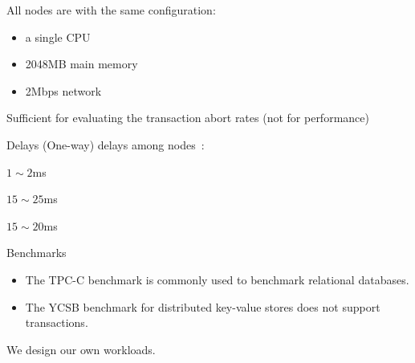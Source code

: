 \begin{frame}{}
  All nodes are with the same configuration: 
  \begin{itemize}
    \item a single CPU 
    \item 2048MB main memory 
    \item 2Mbps network
  \end{itemize}

  \vspace{0.80cm}
  Sufficient for evaluating the transaction abort rates (not for performance)
\end{frame}

\begin{frame}{Delays}
  (One-way) delays among nodes~\footnotemark:
  \begin{description}
    \item[Within datacenter:] $1 \sim 2$ms
    \item[Across datacenters:] $15 \sim 25$ms
    \item[Clients to nodes:] $15 \sim 20$ms
  \end{description}

\end{frame}

\begin{frame}{Benchmarks}
  \begin{itemize}
    \item The TPC-C benchmark is commonly used to benchmark relational databases.
    \item The YCSB benchmark  for distributed key-value stores
      does not support transactions.
  \end{itemize}

  \vspace{0.60cm}
  \centerline{We design our own workloads.}
\end{frame}

\begin{frame}{}
\end{frame}

